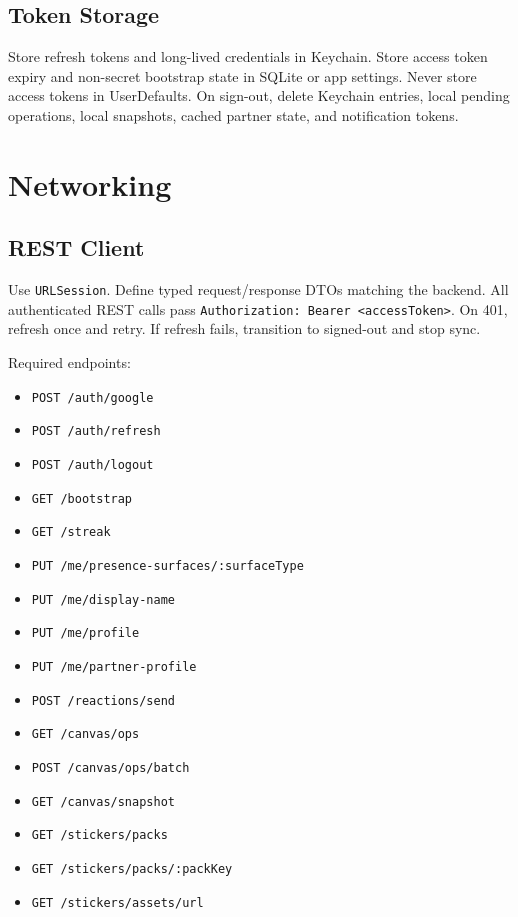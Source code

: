 \documentclass[11pt]{article}
\begin{document}
\subsection{Token Storage}

Store refresh tokens and long-lived credentials in Keychain. Store access token expiry and non-secret bootstrap state in SQLite or app settings. Never store access tokens in UserDefaults. On sign-out, delete Keychain entries, local pending operations, local snapshots, cached partner state, and notification tokens.

\section{Networking}

\subsection{REST Client}

Use \texttt{URLSession}. Define typed request/response DTOs matching the backend. All authenticated REST calls pass \texttt{Authorization: Bearer <accessToken>}. On 401, refresh once and retry. If refresh fails, transition to signed-out and stop sync.

Required endpoints:
\begin{itemize}
  \item \texttt{POST /auth/google}
  \item \texttt{POST /auth/refresh}
  \item \texttt{POST /auth/logout}
  \item \texttt{GET /bootstrap}
  \item \texttt{GET /streak}
  \item \texttt{PUT /me/presence-surfaces/:surfaceType}
  \item \texttt{PUT /me/display-name}
  \item \texttt{PUT /me/profile}
  \item \texttt{PUT /me/partner-profile}
  \item \texttt{POST /reactions/send}
  \item \texttt{GET /canvas/ops}
  \item \texttt{POST /canvas/ops/batch}
  \item \texttt{GET /canvas/snapshot}
  \item \texttt{GET /stickers/packs}
  \item \texttt{GET /stickers/packs/:packKey}
  \item \texttt{GET /stickers/assets/url}
\end{itemize}
\end{document}
